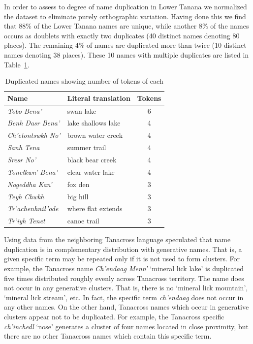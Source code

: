 In order to assess to degree of name duplication in Lower Tanana we normalized the dataset to eliminate purely orthographic variation. Having done this we find that 88\% of the Lower Tanana names are unique, while another 8\% of the names occurs as doublets with exactly two duplicates (40 distinct names denoting 80 places). The remaining 4\% of names are duplicated more than twice (10 distinct names denoting 38 places). These 10 names with multiple duplicates are listed in Table~\ref{holton:tab:duplicates}.


\begin{table}[h]
\centering
\caption{Duplicated names showing number of tokens of each}\label{holton:tab:duplicates}
\begin{tabular}{l | l | c} 
\textbf{Name} &  \textbf{Literal translation} & \textbf{Tokens} \\\hline
\textit{Tobo Bena’} &
swan lake &
 6\\
\textit{Benh Dasr Bena’} &
lake shallows lake &
 4\\
\textit{Ch’etontswkh No’} &
brown water creek &
 4\\
\textit{Sanh Tena} &
summer trail &
 4\\
\textit{Sresr No’} &
black bear creek &
 4\\
\textit{Tonełkwn’ Bena’} &
clear water lake &
 4\\
\textit{Nogeddha Kan’} &
fox den &
 3\\
\textit{Teyh Chwkh} &
big hill &
 3\\
\textit{Tr’achenhnił’ode} &
where flat extends &
 3\\
\textit{Tr’iyh Tenet} &
canoe trail &
 3\\
\end{tabular}
\end{table}

Using data from the neighboring Tanacross language \citet{holton2009c} speculated that name duplication is in complementary distribution with generative names. That is, a given specific term may be repeated only if it is not used to form clusters. For example, the Tanacross name \textit{Ch’endaag Menn’}  ‘mineral lick lake’ is duplicated five times distributed roughly evenly across Tanacross territory. The name does not occur in any generative clusters. That is, there is no ‘mineral lick mountain’, ‘mineral lick stream’, etc. In fact, the specific term \textit{ch’endaag} does not occur in any other names. On the other hand, Tanacross names which occur in generative clusters appear not to be duplicated. For example, the Tanacross specific \textit{ch’inchedl}  ‘nose’ generates a cluster of four names located in close proximity, but there are no other Tanacross names which contain this specific term.

